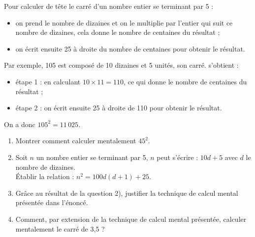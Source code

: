 \begin{exercice}[CRPE 2018 G2] %
   Pour calculer de tête le carré d'un nombre entier se terminant par 5 :
   \begin{itemize}
      \item on prend le nombre de dizaines et on le multiplie par l’entier qui suit ce nombre de dizaines, cela donne le nombre de centaines du résultat ;
      \item on écrit ensuite 25 à droite du nombre de centaines pour obtenir le résultat.
   \end{itemize}
   Par exemple, 105 est composé de 10 dizaines et 5 unités, son carré.   s'obtient :
   \begin{itemize}
      \item étape 1 : en calculant $10\times11 =110$, ce qui donne le nombre de centaines du
résultat ;
      \item étape 2 : on écrit ensuite 25 à droite de 110 pour obtenir le résultat.
   \end{itemize}
   On a donc $105^2 = 11\,025$.
   \begin{enumerate}
      \item Montrer comment calculer mentalement $45^2$.
      \item Soit $n$ un nombre entier se terminant par 5, $n$ peut s’écrire : $10d+5$ avec $d$ le nombre de dizaines. \\
         Établir la relation : $n^2 =100d(d+1)+25$.
      \item Grâce au résultat de la question 2),  justifier la technique de calcul mental présentée dans l’énoncé.
      \item Comment, par extension de la technique de calcul mental présentée, calculer mentalement le carré de 3,5 ?
   \end{enumerate}
\end{exercice}

